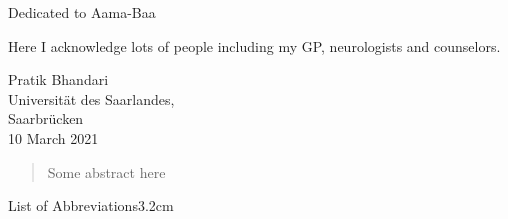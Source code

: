\documentclass[a4paper, nobind]{templates/ociamthesis}
\begin{document}
\begin{romanpages}

\maketitle

\begin{dedication}
  Dedicated to Aama-Baa
\end{dedication}



\begin{acknowledgements}
 	Here I acknowledge lots of people including my GP, neurologists and counselors.

  \begin{flushright}
  Pratik Bhandari \\
  Universität des Saarlandes,\\
  Saarbrücken \\
  10 March 2021
  \end{flushright}
\end{acknowledgements}





\renewcommand{\abstracttitle}{Abstract}
\begin{abstract}
	Some abstract here
\end{abstract}




\flushbottom

\tableofcontents

\listoffigures
	\mtcaddchapter

\listoftables
  \mtcaddchapter
\begin{mclistof}{List of Abbreviations}{3.2cm}


\end{mclistof}
\end{romanpages}
\end{document}
